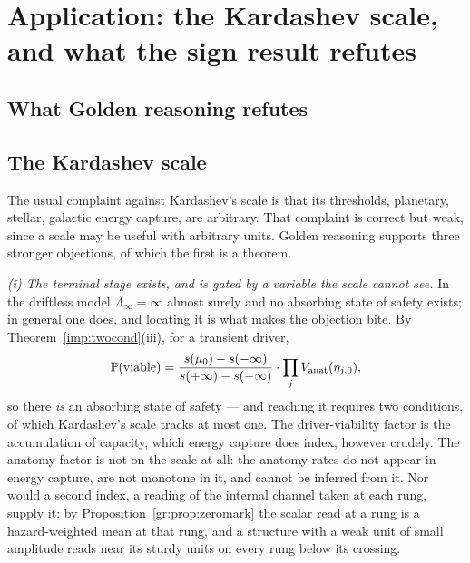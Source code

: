\section{Application: the Kardashev scale, and what the sign result refutes}\label{sec:refutes}

\subsection{What Golden reasoning refutes}\label{gr:sub:refutes}

\subsection{The Kardashev scale}\label{gr:subsub:kardashev}

The usual complaint against Kardashev's scale \cite{Kar64} is that its
thresholds, planetary, stellar, galactic energy capture, are
arbitrary. That complaint is correct but weak, since a scale may be
useful with arbitrary units. Golden reasoning supports three stronger
objections, of which the first is a theorem.

\emph{(i) The terminal stage exists, and is gated by a variable the
scale cannot see.} In the driftless model $\Lambda_\infty=\infty$
almost surely and no absorbing state of safety exists; in general one
does, and locating it is what makes the objection bite. By
Theorem~\ref{imp:twocond}(iii), for a transient driver,
\[
\mathbb{P}(\text{viable})=\frac{s(\mu_0)-s(-\infty)}{s(+\infty)-s(-\infty)}\cdot
\prod_jV_{\mathrm{anat}}(\eta_{j,0}),
\]
so there \emph{is} an absorbing state of safety --- and reaching it
requires two conditions, of which Kardashev's scale tracks at most one.
The driver-viability factor is the accumulation of capacity, which energy
capture does index, however crudely. The anatomy factor is not on the
scale at all: the anatomy rates do not appear in energy capture, are not
monotone in it, and cannot be inferred from it.
Nor would a second index, a reading of the internal channel taken at
each rung, supply it: by Proposition~\ref{gr:prop:zeromark} the scalar read
at a rung is a hazard-weighted mean at that rung, and a
structure with a weak unit of small amplitude reads near its sturdy units on every rung
below its crossing.

